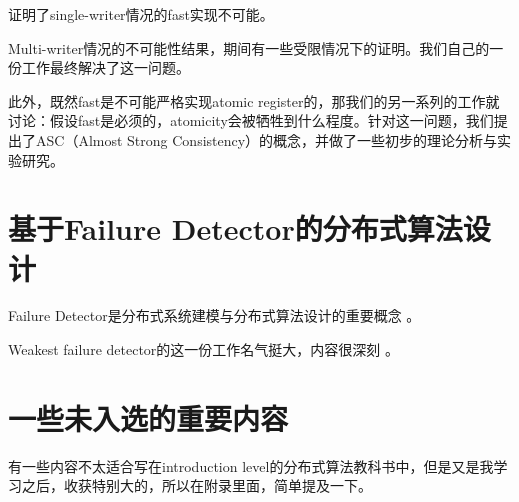 \documentclass[UTF8]{ctexrep}
\begin{document}
\cite{Dutta10}证明了single-writer情况的fast实现不可能。

Multi-writer情况的不可能性结果，期间有一些受限情况下的证明。我们自己的一份工作最终解决了这一问题\cite{Huang20}。

此外，既然fast是不可能严格实现atomic register的，那我们的另一系列的工作就讨论：假设fast是必须的，atomicity会被牺牲到什么程度。针对这一问题，我们提出了ASC（Almost Strong Consistency）的概念，并做了一些初步的理论分析与实验研究\cite{Wei17, Ouyang21}。


\chapter{基于Failure Detector的分布式算法设计}

Failure Detector是分布式系统建模与分布式算法设计的重要概念 \cite{Chandra96unreliable}。

Weakest failure detector的这一份工作名气挺大，内容很深刻 \cite{Chandra96weakest}。



\appendix

\chapter{一些未入选的重要内容}

有一些内容不太适合写在introduction level的分布式算法教科书中，但是又是我学习之后，收获特别大的，所以在附录里面，简单提及一下。
\end{document}
